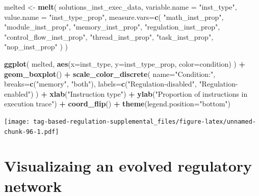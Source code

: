 \documentclass[
]{book}
\newenvironment{Shaded}{\begin{snugshade}}{\end{snugshade}}
\newcommand{\DataTypeTok}[1]{\textcolor[rgb]{0.13,0.29,0.53}{#1}}
\newcommand{\KeywordTok}[1]{\textcolor[rgb]{0.13,0.29,0.53}{\textbf{#1}}}
\newcommand{\NormalTok}[1]{#1}
\newcommand{\OperatorTok}[1]{\textcolor[rgb]{0.81,0.36,0.00}{\textbf{#1}}}
\newcommand{\StringTok}[1]{\textcolor[rgb]{0.31,0.60,0.02}{#1}}
\begin{document}
\begin{Shaded}
\begin{Highlighting}[]
\NormalTok{melted \textless{}{-}}\StringTok{ }\KeywordTok{melt}\NormalTok{(}
\NormalTok{  solutions\_inst\_exec\_data,}
  \DataTypeTok{variable.name =} \StringTok{"inst\_type"}\NormalTok{,}
  \DataTypeTok{value.name =} \StringTok{"inst\_type\_prop"}\NormalTok{,}
  \DataTypeTok{measure.vars=}\KeywordTok{c}\NormalTok{(}
    \StringTok{"math\_inst\_prop"}\NormalTok{,}
    \StringTok{"module\_inst\_prop"}\NormalTok{,}
    \StringTok{"memory\_inst\_prop"}\NormalTok{,}
    \StringTok{"regulation\_inst\_prop"}\NormalTok{,}
    \StringTok{"control\_flow\_inst\_prop"}\NormalTok{,}
    \StringTok{"thread\_inst\_prop"}\NormalTok{,}
    \StringTok{"task\_inst\_prop"}\NormalTok{,}
    \StringTok{"nop\_inst\_prop"}
\NormalTok{  )}
\NormalTok{)}

\KeywordTok{ggplot}\NormalTok{( melted, }\KeywordTok{aes}\NormalTok{(}\DataTypeTok{x=}\NormalTok{inst\_type, }\DataTypeTok{y=}\NormalTok{inst\_type\_prop, }\DataTypeTok{color=}\NormalTok{condition) ) }\OperatorTok{+}
\StringTok{  }\KeywordTok{geom\_boxplot}\NormalTok{() }\OperatorTok{+}
\StringTok{  }\KeywordTok{scale\_color\_discrete}\NormalTok{(}
    \DataTypeTok{name=}\StringTok{"Condition:"}\NormalTok{,}
    \DataTypeTok{breaks=}\KeywordTok{c}\NormalTok{(}\StringTok{"memory"}\NormalTok{, }\StringTok{"both"}\NormalTok{),}
    \DataTypeTok{labels=}\KeywordTok{c}\NormalTok{(}\StringTok{"Regulation{-}disabled"}\NormalTok{, }\StringTok{"Regulation{-}enabled"}\NormalTok{)}
\NormalTok{  ) }\OperatorTok{+}
\StringTok{  }\KeywordTok{xlab}\NormalTok{(}\StringTok{"Instruction type"}\NormalTok{) }\OperatorTok{+}
\StringTok{  }\KeywordTok{ylab}\NormalTok{(}\StringTok{"Proportion of instructions in execution trace"}\NormalTok{) }\OperatorTok{+}
\StringTok{  }\KeywordTok{coord\_flip}\NormalTok{() }\OperatorTok{+}
\StringTok{  }\KeywordTok{theme}\NormalTok{(}\DataTypeTok{legend.position=}\StringTok{"bottom"}\NormalTok{)}
\end{Highlighting}
\end{Shaded}

\texttt{[image: tag-based-regulation-supplemental\_files/figure-latex/unnamed-chunk-96-1.pdf]}

\hypertarget{visualizaing-an-evolved-regulatory-network-1}{%
\section{Visualizaing an evolved regulatory network}\label{visualizaing-an-evolved-regulatory-network-1}}
\end{document}
